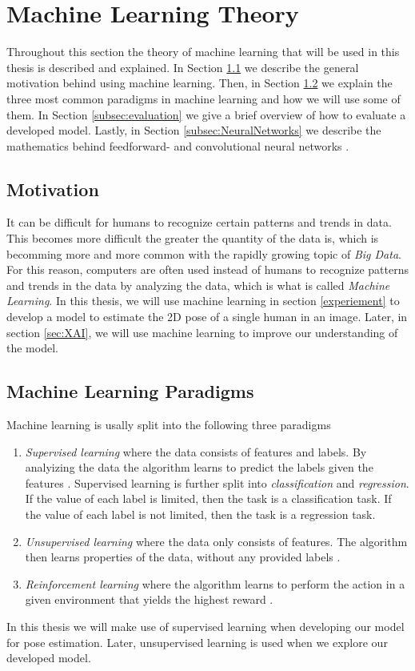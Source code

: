 \documentclass[./main.tex]{subfiles}
\begin{document}
\section{Machine Learning Theory}\label{sec:theory}
Throughout this section the theory of machine learning that will be used in this thesis is described and explained. In Section \ref{subsec:motivation_theory} we describe the general motivation behind using machine learning. Then, in Section \ref{subsec:ml_paradigmes} we explain the three most common paradigms in machine learning and how we will use some of them. In Section \ref{subsec:evaluation} we give a brief overview of how to evaluate a developed model. Lastly, in Section \ref{subsec:NeuralNetworks} we describe the mathematics behind feedforward- and convolutional neural networks .

\subsection{Motivation}\label{subsec:motivation_theory}
It can be difficult for humans to recognize certain patterns and trends in data. This becomes more difficult the greater the quantity of the data is, which is becomming more and more common with the rapidly growing topic of \textit{Big Data}. For this reason, computers are often used instead of humans to recognize patterns and trends in the data by analyzing the data, which is what is called \textit{Machine Learning}. In this thesis, we will use machine learning in section \ref{experiement} to develop a model to estimate the 2D pose of a single human in an image. Later, in section \ref{sec:XAI}, we will use machine learning to improve our understanding of the model.

\subsection{Machine Learning Paradigms}\label{subsec:ml_paradigmes}
Machine learning is usally split into the following three paradigms
\begin{enumerate}
    \item \textit{Supervised learning} where the data consists of features and labels. By analyizing the data the algorithm learns to predict the labels given the features \cite{ESL}. Supervised learning is further split into \textit{classification} and \textit{regression}. If the value of each label is limited, then the task is a classification task. If the value of each label is not limited, then the task is a regression task. 
    \item \textit{Unsupervised learning} where the data only consists of features. The algorithm then learns properties of the data, without any provided labels \cite{ESL}.
    \item \textit{Reinforcement learning} where the algorithm learns to perform the action in a given environment that yields the highest reward \cite{PRML}.
\end{enumerate}
In this thesis we will make use of supervised learning when developing our model for pose estimation. Later, unsupervised learning is used when we explore our developed model.
\end{document}
